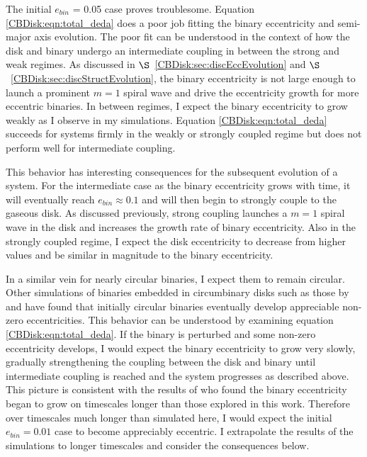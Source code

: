 The initial $e_{bin}$ = 0.05 case proves troublesome.  Equation \ref{CBDisk:eqn:total_deda} does a poor job fitting the binary eccentricity and semi-major axis evolution.  The poor fit can be understood in the context of how the disk and binary undergo an intermediate coupling in between the strong and weak regimes.  As discussed in $\S$~\ref{CBDisk:sec:discEccEvolution} and $\S$~\ref{CBDisk:sec:discStructEvolution}, the binary eccentricity is not large enough to launch a prominent $m = 1$ spiral wave and drive the eccentricity growth for more eccentric binaries.  In between regimes, I expect the binary eccentricity to grow weakly as I observe in my simulations.  Equation \ref{CBDisk:eqn:total_deda} succeeds for systems firmly in the weakly or strongly coupled regime but does not perform well for intermediate coupling.

This behavior has interesting consequences for the subsequent evolution of a system.  For the intermediate case as the binary eccentricity grows with time, it will eventually reach $e_{bin} \approx 0.1$ and will then begin to strongly couple to the gaseous disk.  As discussed previously, strong coupling launches a $m = 1$ spiral wave in the disk and increases the growth rate of binary eccentricity.  Also in the strongly coupled regime, I expect the disk eccentricity to decrease from higher values and be similar in magnitude to the binary eccentricity.  

In a similar vein for nearly circular binaries, I expect them to remain circular.  Other simulations of binaries embedded in circumbinary disks such as those by \citet{Pierens2007} and \citet{Cuadra2009} have found that initially circular binaries eventually develop appreciable non-zero eccentricities.  This behavior can be understood by examining equation \ref{CBDisk:eqn:total_deda}.  If the binary is perturbed and some non-zero eccentricity develops, I would expect the binary eccentricity to grow very slowly, gradually strengthening the coupling between the disk and binary until intermediate coupling is reached and the system progresses as described above.  This picture is consistent with the results of \citet{Pierens2007} who found the binary eccentricity began to grow on timescales longer than those explored in this work.  Therefore over timescales much longer than simulated here, I would expect the initial $e_{bin} = 0.01$ case to become appreciably eccentric.  I extrapolate the results of the simulations to longer timescales and consider the consequences below.


